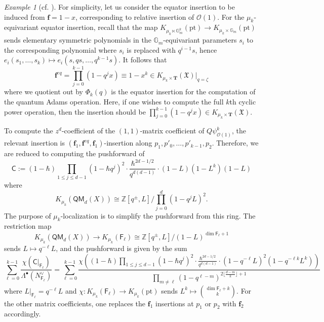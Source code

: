 \documentclass[reqno]{amsart}
\numberwithin{equation}{section}
\numberwithin{equation}{section}
\numberwithin{equation}{section}
\theoremstyle{definition}
\theoremstyle{remark}
\theoremstyle{remark}
\newtheorem{example}[thm]{Example}
\begin{document}
\begin{example}[{cf. \cite[Section 6.3]{Lee23a}}]
    For simplicity, let us consider the equator insertion to be induced from $\mathbf{f} = 1-x$, corresponding to relative insertion of $\mathcal{O}(1)$. For the $\mu_k$-equivariant equator insertion, recall that the map $K_{\mu_k \ltimes \mathbb{G}_m^k} (\mathrm{pt}) \to K_{\mu_k \times \mathbb{G}_m}(\mathrm{pt})$ sends elementary symmetric polynomials in the $\mathbb{G}_m$-equivariant parameters $s_i$ to the corresponding polynomial where $s_i$ is replaced with $q^{i-1}s$, hence $e_i(s_1, \dots, s_k) \mapsto e_i (s, qs, \dots, q^{k-1}s)$. It follows that
    \begin{equation}
        \mathbf{f}^{eq} = \prod_{j=0}^{k-1} (1-q^j x) \equiv 1 - x^k \in K_{\mu_k \times \mathbf{T}}(\mathfrak{X})|_{q=\zeta}
    \end{equation}
    where we quotient out by $\Phi_k(q)$ is the equator insertion for the computation of the quantum Adams operation. Here, if one wishes to compute the full $k$th cyclic power operation, then the insertion should be $\prod_{j=0}^{k-1} (1-q^j x) \in K_{\mu_k \times \mathbf{T}}(\mathfrak{X})$.

    To compute the $z^d$-coefficient of the $(1,1)$-matrix coefficient of $Q\psi^k_{\mathcal{O}(1)}$, the relevant insertion is $(\mathbf{f}_1, \mathbf{f}^{eq}, \mathbf{f}_1)$-insertion along $p_1, p'_0, \dots, p'_{k-1}, p_2$. Therefore, we are reduced to computing the pushforward of
    \begin{equation}
        \mathsf{C} := (1-\hbar) \prod_{1 \le j \le d-1}(1-\hbar q^j)^2 \cdot \frac{\hbar^{2d-1/2}}{q^{d(d-1)}} \cdot (1 - L)(1-L^k)(1-L)
    \end{equation}
    where
    \begin{equation}
        K_{\mu_k}(\mathsf{QM}_d(X)) \cong \mathbb{Z}[q^\pm , L]/ \prod_{j=0}^d (1-q^j L)^2.
    \end{equation}
    The purpose of $\mu_k$-localization is to simplify the pushforward from this ring. The restriction map
    \begin{equation}
        K_{\mu_k}(\mathsf{QM}_d(X)) \to K_{\mu_k}(\mathsf{F}_\ell) \cong \mathbb{Z}[q^\pm, L]/(1-L)^{\dim \mathsf{F}_\ell+1}
    \end{equation}
    sends $L \mapsto q^{-\ell} L$, and the pushforward is given by the sum
    \begin{equation}
        \sum_{\ell=0}^{k-1} \frac{\chi( \mathsf{C}|_{\mathsf{F}_\ell})}{\Lambda^\bullet (N_{\mathsf{F}_\ell}^\vee)} = \sum_{\ell=0}^{k-1} \frac{ \chi\left((1-\hbar) \prod_{1 \le j \le d-1}(1-\hbar q^j)^2 \cdot \frac{\hbar^{2d-1/2}}{q^{d(d-1)}} \cdot (1 - q^{-\ell} L)^2(1-q^{-\ell k}L^k)\right)  }{ \prod_{m \neq \ell}(1- q^{\ell-m})^{2 \lfloor \frac{d-m}{k} \rfloor + 1}}
    \end{equation}
    where $L |_{\mathsf{F}_\ell} = q^{-\ell} L$ and $\chi : K_{\mu_k} (\mathsf{F}_\ell) \to K_{\mu_k}(\mathrm{pt})$ sends $L^k \mapsto \binom{\dim \mathsf{F}_\ell + k}{k}$. For the other matrix coefficients, one replaces the $\mathbf{f}_1$ insertions at $p_1$ or $p_2$ with $\mathbf{f}_2$ accordingly.
    

\end{example}
\end{document}
